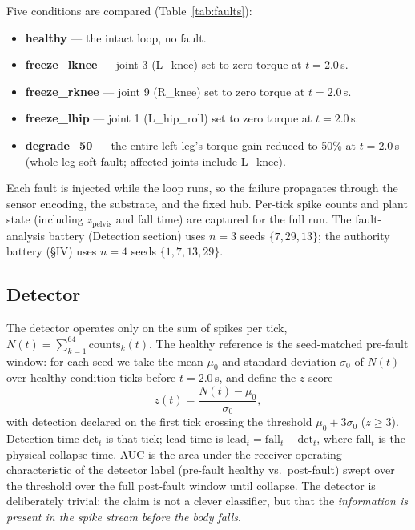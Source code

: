 Five conditions are compared (Table~\ref{tab:faults}):
\begin{itemize}
\item \textbf{healthy} --- the intact loop, no fault.
\item \textbf{freeze\_lknee} --- joint 3 (L\_knee) set to zero torque at
      $t = 2.0$\,s.
\item \textbf{freeze\_rknee} --- joint 9 (R\_knee) set to zero torque at
      $t = 2.0$\,s.
\item \textbf{freeze\_lhip} --- joint 1 (L\_hip\_roll) set to zero torque at
      $t = 2.0$\,s.
\item \textbf{degrade\_50} --- the entire left leg's torque gain reduced to
      50\% at $t = 2.0$\,s (whole-leg soft fault; affected joints include
      L\_knee).
\end{itemize}

Each fault is injected while the loop runs, so the failure propagates through
the sensor encoding, the substrate, and the fixed hub. Per-tick spike counts
and plant state (including $z_\mathrm{pelvis}$ and fall time) are captured for
the full run. The fault-analysis battery (Detection section) uses $n = 3$ seeds
$\{7, 29, 13\}$; the authority battery (\S IV) uses $n = 4$ seeds
$\{1, 7, 13, 29\}$.

\subsection{Detector}

The detector operates only on the sum of spikes per tick,
$N(t) = \sum_{k=1}^{64} \mathrm{counts}_k(t)$. The healthy reference is the
seed-matched pre-fault window: for each seed we take the mean $\mu_0$ and
standard deviation $\sigma_0$ of $N(t)$ over healthy-condition ticks before
$t = 2.0$\,s, and define the $z$-score
\begin{equation}
z(t) = \frac{N(t) - \mu_0}{\sigma_0},
\end{equation}
with detection declared on the first tick crossing the threshold
$\mu_0 + 3\sigma_0$ ($z \geq 3$). Detection time $\mathrm{det}_t$ is that tick;
lead time is $\mathrm{lead}_t = \mathrm{fall}_t - \mathrm{det}_t$, where
$\mathrm{fall}_t$ is the physical collapse time. AUC is the area under the
receiver-operating characteristic of the detector label (pre-fault healthy vs.\
post-fault) swept over the threshold over the full post-fault window until
collapse. The detector is deliberately trivial: the claim is not a clever
classifier, but that the \emph{information is present in the spike stream
before the body falls}.

